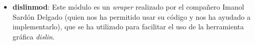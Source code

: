 \documentclass[11pt,singlespacing,liststotoc,headsepline,a4paper]{article}
\begin{document}
\begin{itemize}
\item \textbf{dislinmod}: Este módulo es un \textit{wraper} realizado por el compañero Imanol Sardón Delgado (quien nos ha permitido usar su código y nos ha ayudado a implementarlo), que se ha utilizado para facilitar el uso de la herramienta gráfica \textit{dislin}.


\end{itemize}
\end{document}

